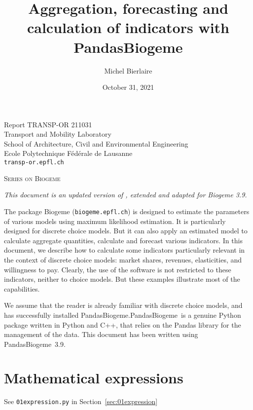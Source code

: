 \documentclass[12pt,a4paper]{article}
\title{Aggregation, forecasting and calculation of  indicators with PandasBiogeme}
\author{Michel Bierlaire}
\date{October 31, 2021}
\newcommand{\PDBIOGEME}{PandasBiogeme}
\begin{document}
\begin{titlepage}
\pagestyle{empty}

\maketitle
\vspace{2cm}

\begin{center}
\small Report TRANSP-OR 211031 \\ Transport and Mobility Laboratory \\ School of Architecture, Civil and Environmental Engineering \\ Ecole Polytechnique F\'ed\'erale de Lausanne \\ \verb+transp-or.epfl.ch+
\begin{center}
\textsc{Series on Biogeme}
\end{center}
\end{center}


\clearpage
\end{titlepage}

\emph{This document is an updated version of ,
  extended and adapted for Biogeme 3.9.}

The package Biogeme (\texttt{biogeme.epfl.ch}) is designed to estimate
the parameters of various models using maximum likelihood
estimation. It is particularly designed for discrete choice
models. But it can also apply an estimated model to calculate
aggregate quantities, calculate and forecast various indicators. In
this document, we describe how to calculate some indicators
particularly relevant in the context of discrete choice models: market
shares, revenues, elasticities, and willingness to pay. Clearly, the
use of the software is not restricted to these indicators, neither to
choice models. But these examples illustrate most of the capabilities.

We assume that the reader is already familiar with discrete choice
models, and has successfully installed \PDBIOGEME.\@  \PDBIOGEME\ is
a genuine Python package written in Python and C++, that relies on the
Pandas library for the management of the data.  This document has
been written using \PDBIOGEME\ 3.9.

\section{Mathematical expressions}

\begin{flushright}
See \lstinline$01expression.py$ in Section~\ref{sec:01expression}
\end{flushright}
\end{document}
